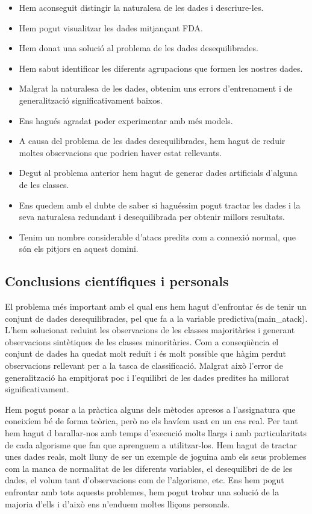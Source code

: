 \documentclass[a4paper]{article} %
\begin{document}
\begin{itemize}
    \item Hem aconseguit distingir la naturalesa de les dades i descriure-les.
    \item Hem pogut visualitzar les dades mitjançant FDA.
    \item Hem donat una solució al problema de les dades desequilibrades.
    \item Hem sabut identificar les diferents agrupacions que formen les nostres dades.
    \item Malgrat la naturalesa de les dades, obtenim uns errors d'entrenament i de generalització significativament baixos.
    \item Ens hagués agradat poder experimentar amb més models.
    \item A causa del problema de les dades desequilibrades, hem hagut de reduir moltes observacions que podrien haver estat rellevants.
    \item Degut al problema anterior hem hagut de generar dades artificials d'alguna de les classes.
    \item Ens quedem amb el dubte de saber si haguéssim pogut tractar les dades i la seva naturalesa redundant i desequilibrada per obtenir millors resultats.
    \item Tenim un nombre considerable d'atacs predits com a connexió normal, que són els pitjors en aquest domini.
\end{itemize}

\subsection{Conclusions científiques i personals}
El problema més important amb el qual ens hem hagut d'enfrontar és de tenir un conjunt de dades desequilibrades, pel que fa a la variable predictiva(main\_atack). L'hem solucionat reduint les observacions de les classes majoritàries i generant observacions sintètiques de les classes minoritàries. Com a conseqüència el conjunt de dades ha quedat molt reduït i és molt possible que hàgim perdut observacions rellevant per a la tasca de classificació. Malgrat això l'error de generalització ha empitjorat poc i l'equilibri de les dades predites ha millorat significativament.

Hem pogut posar a la pràctica alguns dels mètodes apresos a l'assignatura que coneixíem bé de forma teòrica, però no els havíem usat en un cas real. Per tant hem hagut d barallar-nos amb temps d'execució molts llargs i amb particularitats de cada algorisme que fan que aprenguem a utilitzar-los. Hem hagut de tractar unes dades reals, molt lluny de ser un exemple de joguina amb els seus problemes com la manca de normalitat de les diferents variables, el desequilibri de de les dades, el volum tant d'observacions com de l'algorisme, etc.
Ens hem pogut enfrontar amb tots aquests problemes, hem pogut trobar una solució de la majoria d'ells i d'això ens n'enduem moltes lliçons personals.
\end{document}
